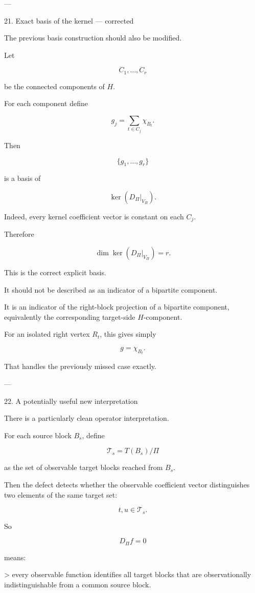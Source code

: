 ---

21. Exact basis of the kernel — corrected

The previous basis construction should also be modified.

Let

\[
C_1,\ldots,C_r
\]

be the connected components of \(H\).

For each component define

\[
g_j
=
\sum_{t\in C_j}\chi_{B_t}.
\]

Then

\[
\boxed{
\{g_1,\ldots,g_r\}
}
\]

is a basis of

\[
\ker(D_\Pi|_{V_\Pi}).
\]

Indeed, every kernel coefficient vector is constant on each \(C_j\).

Therefore

\[
\dim\ker(D_\Pi|_{V_\Pi})=r.
\]

This is the correct explicit basis.

It should not be described as an indicator of a bipartite component.

It is an indicator of the right-block projection of a bipartite component, equivalently the corresponding target-side \(H\)-component.

For an isolated right vertex \(R_t\), this gives simply

\[
g=\chi_{B_t}.
\]

That handles the previously missed case exactly.


---

22. A potentially useful new interpretation

There is a particularly clean operator interpretation.

For each source block \(B_s\), define

\[
\mathcal T_s=T(B_s)/\Pi
\]

as the set of observable target blocks reached from \(B_s\).

Then the defect detects whether the observable coefficient vector distinguishes two elements of the same target set:

\[
t,u\in\mathcal T_s.
\]

So

\[
D_\Pi f=0
\]

means:

> every observable function identifies all target blocks that are observationally indistinguishable from a common source block.



